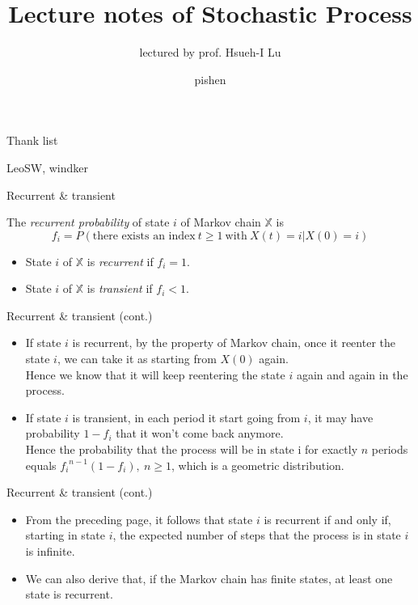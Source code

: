 \documentclass{beamer}
\title[Stochastic Process]{Lecture notes of Stochastic Process}
\subtitle{lectured by prof. Hsueh-I Lu}
\author{pishen}
\institute[AlgoLab]{AlgoLab, CSIE, NTU}
\begin{document}
\begin{frame}[plain]
	\titlepage
\end{frame}

\begin{frame}{Thank list}
\begin{center}
LeoSW, windker
\end{center}
\end{frame}

\begin{frame}{Recurrent \& transient}
	\begin{definition}
	The \textit{recurrent probability} of state $i$ of Markov chain $\mathbb{X}$ is 
	\[
	f_i = P(\text{there exists an index}~t \geq 1~\text{with}~X(t)=i | X(0)=i)
	\]
	\begin{itemize}
	\item State $i$ of $\mathbb{X}$ is \textit{recurrent} if $f_i = 1$.
	\item State $i$ of $\mathbb{X}$ is \textit{transient} if $f_i < 1$.
	\end{itemize}
	\end{definition}
\end{frame}

\begin{frame}{Recurrent \& transient (cont.)}
	\begin{itemize}
	\item If state $i$ is recurrent, by the property of Markov chain, 
		once it reenter the state $i$, we can take it as starting from $X(0)$ again. \\
		Hence we know that it will keep reentering the state $i$ again and again in the process.
	\item If state $i$ is transient, in each period it start going from $i$,
		it may have probability $1 - f_i$ that it won't come back anymore. \\
		Hence the probability that the process will be in state i for exactly $n$ periods equals
		${f_i}^{n-1}(1-f_i), ~n \geq 1$, which is a geometric distribution.
	\end{itemize}
\end{frame}

\begin{frame}{Recurrent \& transient (cont.)}
	\begin{itemize}
	\item From the preceding page, it follows that state $i$ is recurrent if and only if,
		starting in state $i$, the expected number of steps that the process is in state $i$ is infinite.
	\item We can also derive that, if the Markov chain has finite states, at least one state is recurrent.
	\end{itemize}
\end{frame}
\end{document}

